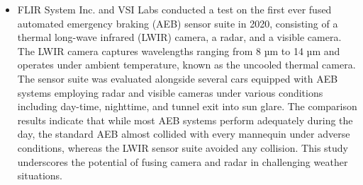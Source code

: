 \documentclass[rnd]{mas_proposal}
\begin{document}
\begin{itemize}
      \item FLIR System Inc. \cite{fused_aeb} and VSI Labs \cite{VSILabs} conducted a test on the first ever fused automated emergency braking (AEB) sensor suite in 2020, consisting of a thermal long-wave infrared (LWIR) camera, a radar, and a visible camera. The LWIR camera captures wavelengths ranging from 8 µm to 14 µm and operates under ambient temperature, known as the uncooled thermal camera. The sensor suite was evaluated alongside several cars equipped with AEB systems employing radar and visible cameras under various conditions including day-time, nighttime, and tunnel exit into sun glare. The comparison results indicate that while most AEB systems perform adequately during the day, the standard AEB almost collided with every mannequin under adverse conditions, whereas the LWIR sensor suite avoided any collision. This study underscores the potential of fusing camera and radar in challenging weather situations.
      


\end{itemize}
\end{document}
